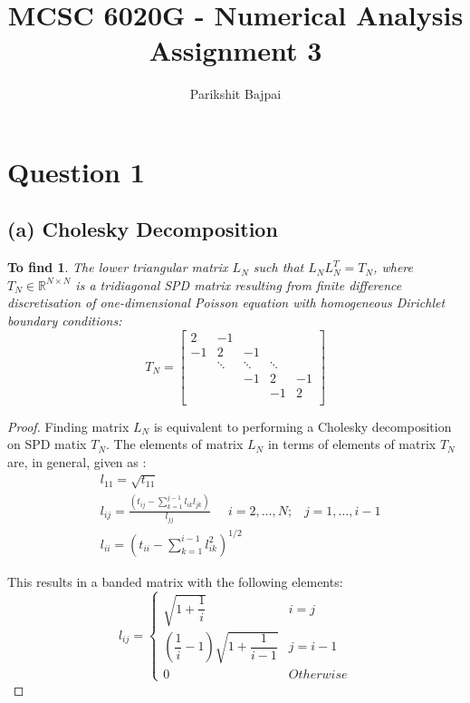 \documentclass[11pt, oneside]{article}
\title{MCSC 6020G - Numerical Analysis \\
        \Large Assignment 3}
\author{Parikshit Bajpai}
\date{}
\newtheorem*{remark}{To find}
\begin{document}
\maketitle

\section*{Question 1}
\subsection{(a) Cholesky Decomposition}
	\begin{remark}
		The lower triangular matrix $L_N$ such that $L_N L_N^T = T_N$, where $T_N \in \mathbb{R}^{N \times N}$ is a tridiagonal SPD matrix resulting from finite difference discretisation of one-dimensional Poisson equation with homogeneous Dirichlet boundary conditions:
    \begin{equation}
      T_N = \begin{bmatrix}
      2 	& -1 		&  		&  		& \\
      -1 	& 2 		& -1 		&  		& \\
       	& \ddots 	& \ddots 	& \ddots 	& \\
       	&  		& -1	 	& 2 		& -1 \\
       	&  		&  		& -1 		& 2 \\
    \end{bmatrix}
    \end{equation}
	\end{remark}
	\begin{proof}
		Finding matrix $L_N$ is equivalent to performing a Cholesky decomposition on SPD matix $T_N$. The elements of matrix $L_N$ in terms of elements of matrix $T_N$ are, in general, given as \cite{quarteroni2017}:
    \begin{align}
      &l_{11} = \sqrt{t_{11}} \\
      &l_{ij} = \frac{\left(t_{ij} - \sum_{k=1}^{j-1} l_{ik} l_{jk} \right)}{l_{jj}} \mspace{25mu} i = 2, \dots, N;  \mspace{15mu} j = 1, \dots, i-1 \\
      &l_{ii} = \left(t_{ii} - \sum_{k=1}^{i-1} l_{ik}^2 \right)^{1/2}
    \end{align}

    This results in a banded matrix with the following elements:
    \begin{equation}\label{Generic_LN}
      l_{ij} = \begin{cases}
            \sqrt{1+\dfrac{1}{i}} & i=j\\
            \left(\dfrac{1}{i}-1\right)\sqrt{1+\dfrac{1}{i-1}} & j=i-1\\
            0 & Otherwise
          \end{cases}
      \end{equation} \qedhere
      \end{proof}
\end{document}
